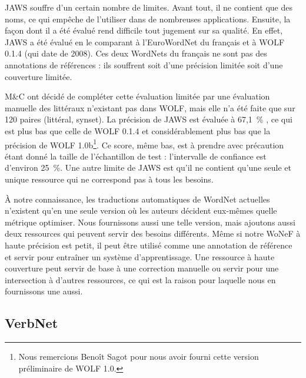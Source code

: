 JAWS souffre d'un certain nombre de limites. Avant tout, il ne contient que des noms, ce qui empêche de l'utiliser dans de nombreuses applications. Ensuite, la façon dont il a été évalué rend difficile tout jugement sur sa qualité. En effet, JAWS a été évalué en le comparant à l'EuroWordNet du français et à WOLF 0.1.4 (qui date de 2008). Ces deux WordNets du français ne sont pas des annotations de références : ils souffrent soit d'une précision limitée soit d'une couverture limitée.

M\&C ont décidé de compléter cette évaluation limitée par une évaluation manuelle des littéraux n'existant pas dans WOLF, mais elle n'a été faite que sur 120 paires (littéral, synset). La précision de JAWS est évaluée à 67,1~\% \citep{mouton2010phd}, ce qui est plus bas que celle de WOLF 0.1.4 et considérablement plus bas que la précision de WOLF 1.0b\footnote{Nous remercions Benoît Sagot pour nous avoir fourni cette version préliminaire de WOLF 1.0.}. Ce score, même bas, est à prendre avec précaution étant donné la taille de l'échantillon de test : l'intervalle de confiance est d'environ 25~\%. Une autre limite de JAWS est qu'il ne contient qu'une seule et unique ressource qui ne correspond pas à tous les besoins.

À notre connaissance, les traductions automatiques de WordNet actuelles n'existent qu'en une seule version où les auteurs décident eux-mêmes quelle métrique optimiser. Nous fournissons aussi une telle version, mais ajoutons aussi deux ressources qui peuvent servir des besoins différents. Même si notre WoNeF à haute précision est petit, il peut être utilisé comme une annotation de référence et servir pour entraîner un système d'apprentissage. Une ressource à haute couverture peut servir de base à une correction manuelle ou servir pour une intersection à d'autres ressources, ce qui est la raison pour laquelle nous en fournissons une aussi.


\subsection{VerbNet}


